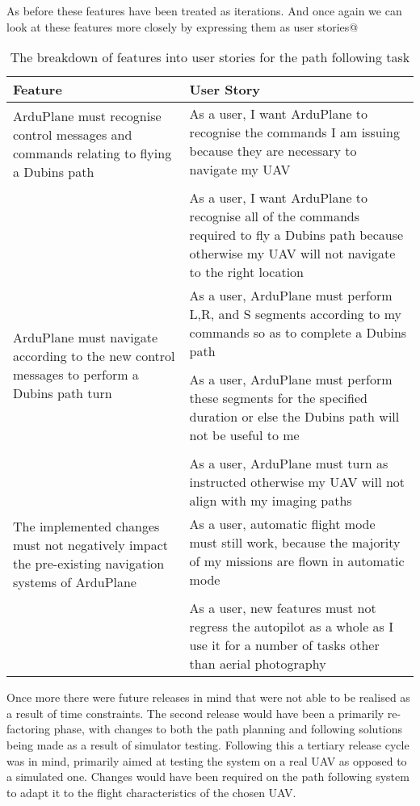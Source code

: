 As before these features have been treated as iterations. And once again we can look at these features more closely by expressing them as user stories@

\begin{table}[h!]
\centering
\caption{The breakdown of features into user stories for the path following task\label{tab:task2planning}}
 \begin{tabular}{p{} | p{}}
	\hline
	\textbf{Feature} & \textbf{User Story} \\
	\hline
	\hline
	\multirow{2}{0.4\textwidth}{ArduPlane must recognise control messages and commands relating to flying a Dubins path} & As a user, I want ArduPlane to recognise the commands I am issuing because they are necessary to navigate my UAV \\
	\\
	&  As a user, I want ArduPlane to recognise all of the commands required to fly a Dubins path because otherwise my UAV will not navigate to the right location\\
	\hline
	\multirow{3}{0.4\textwidth}{ArduPlane must navigate according to the new control messages to perform a Dubins path turn} &  As a user, ArduPlane must perform L,R, and S segments according to my commands so as to complete a Dubins path\\
	\\
	&  As a user, ArduPlane must perform these segments for the specified duration or else the Dubins path will not be useful to me\\
	\\
	&   As a user, ArduPlane must turn as instructed otherwise my UAV will not align with my imaging paths\\
	\hline
	\multirow{2}{0.4\textwidth}{The implemented changes must not negatively impact the pre-existing navigation systems of ArduPlane} &  As a user, automatic flight mode must still work, because the majority of my missions are flown in automatic mode\\
	\\
	&  As a user, new features must not regress the autopilot as a whole as I use it for a number of tasks other than aerial photography \\
	\hline
 \end{tabular}
\end{table}


Once more there were future releases in mind that were not able to be realised as a result of time constraints. The second release would have been a primarily re-factoring phase, with changes to both the path planning and following solutions being made as a result of simulator testing. Following this a tertiary release cycle was in mind, primarily aimed at testing the system on a real UAV as opposed to a simulated one. Changes would have been required on the path following system to adapt it to the flight characteristics of the chosen UAV.

